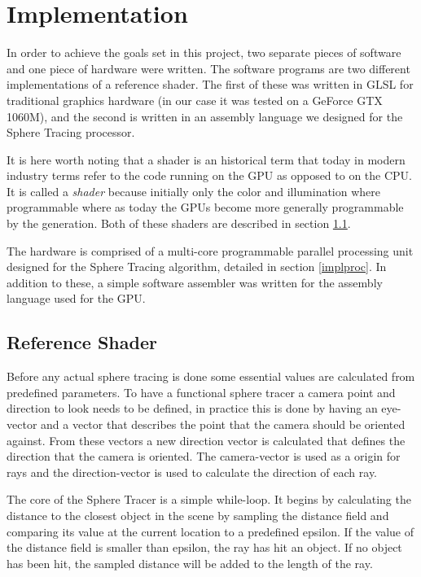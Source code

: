 \chapter{Implementation}

	In order to achieve the goals set in this project, two separate pieces of
	software and one piece of hardware were written. The software programs are
	two different implementations of a reference shader. The first of these was
	written in GLSL for traditional graphics hardware (in our case it was tested
	on a GeForce GTX 1060M), and the second is written in an assembly language
	we designed for the Sphere Tracing processor.
	
	It is here worth noting that a shader is an historical term that today in
	modern industry terms refer to the code running on the GPU as opposed to on
	the CPU. It is called a \emph{shader} because initially only the color and
	illumination where programmable where as today the GPUs become more
	generally programmable by the generation. Both of these shaders are
	described in section \ref{implshader}.
	
	The hardware is comprised of a multi-core programmable parallel processing
	unit designed for the Sphere Tracing algorithm, detailed in section
	\ref{implproc}. In addition to these, a simple software assembler was
	written for the assembly language used for the GPU.
	
	\section{Reference Shader} \label{implshader}

		Before any actual sphere tracing is done some essential values are
		calculated from predefined parameters. To have a functional sphere
		tracer a camera point and direction to look needs to be defined, in
		practice this is done by having an eye-vector and a vector that
		describes the point that the camera should be oriented against. From
		these vectors a new direction vector is calculated that defines the
		direction that the camera is oriented. The camera-vector is used as a
		origin for rays and the direction-vector is used to calculate the
		direction of each ray.
		
		The core of the Sphere Tracer is a simple while-loop. It begins by
		calculating the distance to the closest object in the scene by sampling
		the distance field and comparing its value at the current location to a
		predefined epsilon. If the value of the distance field is smaller than
		epsilon, the ray has hit an object. If no object has been hit, the
		sampled distance will be added to the length of the ray.


